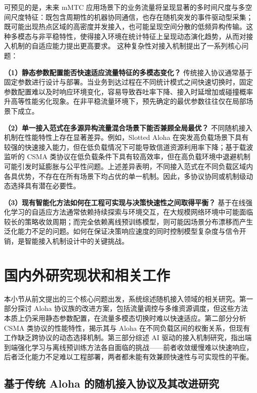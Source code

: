 可预见的是，未来 mMTC 应用场景下的业务流量将呈现显著的多时间尺度与多空间尺度特征：既包含周期性的机器协同通信，也存在随机突发的事件驱动型采集；既可能出现热点区域的高密度并发接入，也可能呈现空间分散的低频异构传输。这种多模态与非平稳特性，使得接入环境在统计特征上呈现动态演化趋势，从而对接入机制的自适应能力提出更高要求。
这种复杂性对接入机制提出了一系列核心问题：

\noindent\textbf{（1）静态参数配置能否快速适应流量特征的多模态变化？} 传统接入协议通常基于固定参数进行设计与部署。当业务到达过程在不同统计模式之间快速切换时，固定参数配置难以及时响应环境变化，容易导致吞吐率下降、接入时延增加或碰撞概率升高等性能劣化现象。在非平稳流量环境下，预先确定的最优参数往往仅在局部场景下成立。

\noindent\textbf{（2）单一接入范式在多源异构流量混合场景下能否兼顾全局最优？} 不同随机接入机制在性能特性上存在显著差异。例如，Slotted Aloha 在突发高负载场景下具有较强的快速接入能力，但在低负载情况下可能导致信道资源利用率下降；基于载波监听的 CSMA 类协议在低负载条件下具有较高效率，但在高负载环境中退避机制可能引发时延膨胀与公平性问题。上述差异表明，不同接入范式在不同负载区域内各具优势，不存在在所有场景下均占优的单一机制。因此，多协议协同或机制级动态选择具有潜在必要性。

\noindent\textbf{（3）现有智能化方法如何在工程可实现与决策快速性之间取得平衡？} 基于在线强化学习的自适应方法通常依赖持续探索与环境交互，在大规模网络环境中可能面临较长的策略收敛周期；而完全依赖离线预训练模型，则可能因场景分布漂移而产生泛化能力不足的问题。如何在保证决策响应速度的同时控制模型复杂度与信令开销，是智能接入机制设计中的关键挑战。


\section{国内外研究现状和相关工作}
\label{sec:related_work}

本小节从前文提出的三个核心问题出发，系统综述随机接入领域的相关研究。第一部分探讨 Aloha 协议族的改进方案，包括流量调控与多维资源调度，但这些方法本质上仍采用静态参数配置，在流量多模态切换时难以快速适应。第二部分分析 CSMA 类协议的性能特性，揭示其与 Aloha 在不同负载区间的权衡关系，但现有工作缺乏跨协议的动态选择机制。第三部分综述 AI 驱动的接入机制研究，指出端到端强化学习与离线预训练方法各自面临的挑战——前者收敛缓慢难以快速响应，后者泛化能力不足难以工程部署，两者都未能有效兼顾快速性与可实现性的平衡。

\subsection{基于传统 Aloha 的随机接入协议及其改进研究}
\label{subsec:related_mechanism}


